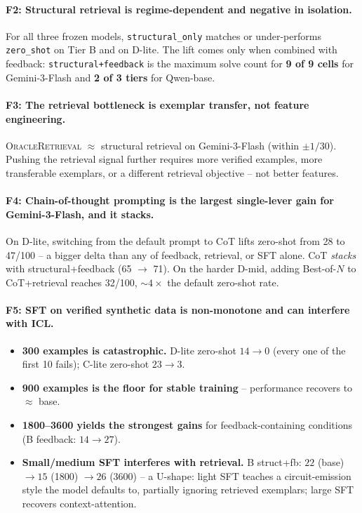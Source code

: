 \documentclass[11pt]{article}
\begin{document}
\paragraph{F2: Structural retrieval is regime-dependent and negative in isolation.} For all three frozen models, \texttt{structural\_only} matches or under-performs \texttt{zero\_shot} on Tier B and on D-lite. The lift comes only when combined with feedback: \texttt{structural+feedback} is the maximum solve count for \textbf{9 of 9 cells} for Gemini-3-Flash and \textbf{2 of 3 tiers} for Qwen-base.

\paragraph{F3: The retrieval bottleneck is exemplar transfer, not feature engineering.} \textsc{OracleRetrieval} $\approx$ structural retrieval on Gemini-3-Flash (within $\pm1/30$). Pushing the retrieval signal further requires more verified examples, more transferable exemplars, or a different retrieval objective -- not better features.

\paragraph{F4: Chain-of-thought prompting is the largest single-lever gain for Gemini-3-Flash, and it stacks.}
On D-lite, switching from the default prompt to CoT lifts zero-shot from 28
to 47/100 -- a bigger delta than any of feedback, retrieval, or SFT alone. CoT
\emph{stacks} with structural+feedback (65 $\to$ 71). On the harder D-mid,
adding Best-of-$N$ to CoT+retrieval reaches 32/100, $\sim 4\times$ the default
zero-shot rate.

\paragraph{F5: SFT on verified synthetic data is non-monotone and can interfere with ICL.}
\begin{itemize}[leftmargin=*,topsep=2pt,itemsep=0pt]
    \item \textbf{300 examples is catastrophic.} D-lite zero-shot $14\to0$ (every one of the first 10 fails); C-lite zero-shot $23\to3$.
    \item \textbf{900 examples is the floor for stable training} -- performance recovers to $\approx$ base.
    \item \textbf{1800--3600 yields the strongest gains} for feedback-containing conditions (B feedback: $14\to27$).
    \item \textbf{Small/medium SFT interferes with retrieval.} B struct+fb: $22$ (base) $\to 15$ (1800) $\to 26$ (3600) -- a U-shape: light SFT teaches a circuit-emission style the model defaults to, partially ignoring retrieved exemplars; large SFT recovers context-attention.
\end{itemize}
\end{document}
